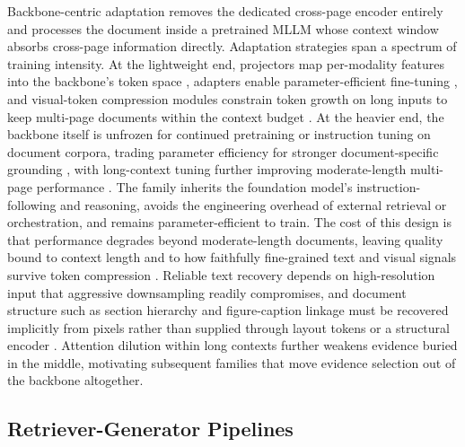 \documentclass[11pt]{article}
\begin{document}
Backbone-centric adaptation removes the dedicated cross-page encoder entirely and processes the document inside a pretrained MLLM whose context window absorbs cross-page information directly. Adaptation strategies span a spectrum of training intensity. At the lightweight end, projectors map per-modality features into the backbone's token space \cite{tanaka2024instructdoc}, adapters enable parameter-efficient fine-tuning \cite{zhu2025simple}, and visual-token compression modules constrain token growth on long inputs to keep multi-page documents within the context budget \cite{hu2025mplugdocowl2}. At the heavier end, the backbone itself is unfrozen for continued pretraining or instruction tuning on document corpora, trading parameter efficiency for stronger document-specific grounding \cite{duan2025docopilot}, with long-context tuning further improving moderate-length multi-page performance \cite{hu2024mplugdocowl, yu2024texthawk2}. The family inherits the foundation model's instruction-following and reasoning, avoids the engineering overhead of external retrieval or orchestration, and remains parameter-efficient to train. The cost of this design is that performance degrades beyond moderate-length documents, leaving quality bound to context length and to how faithfully fine-grained text and visual signals survive token compression \cite{jia2024leopard}. Reliable text recovery depends on high-resolution input that aggressive downsampling readily compromises, and document structure such as section hierarchy and figure-caption linkage must be recovered implicitly from pixels rather than supplied through layout tokens or a structural encoder \cite{hannan2025docslm, duan2025docopilot}. Attention dilution within long contexts \cite{liu2024lost} further weakens evidence buried in the middle, motivating subsequent families that move evidence selection out of the backbone altogether.

\subsection{Retriever-Generator Pipelines}
\label{sec:arch-rg}
\end{document}
